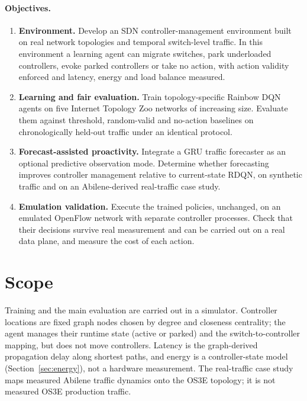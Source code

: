 \paragraph{Objectives.}
\begin{enumerate}[label=\textbf{O\arabic*.}, leftmargin=*]
  \item \textbf{Environment.} Develop an SDN controller-management environment built on real network topologies and temporal switch-level traffic. In this environment a learning agent can migrate switches, park underloaded controllers, evoke parked controllers or take no action, with action validity enforced and latency, energy and load balance measured.
  \item \textbf{Learning and fair evaluation.} Train topology-specific Rainbow DQN agents on five Internet Topology Zoo networks of increasing size. Evaluate them against threshold, random-valid and no-action baselines on chronologically held-out traffic under an identical protocol.
  \item \textbf{Forecast-assisted proactivity.} Integrate a GRU traffic forecaster as an optional predictive observation mode. Determine whether forecasting improves controller management relative to current-state RDQN, on synthetic traffic and on an Abilene-derived real-traffic case study.
  \item \textbf{Emulation validation.} Execute the trained policies, unchanged, on an emulated OpenFlow network with separate controller processes. Check that their decisions survive real measurement and can be carried out on a real data plane, and measure the cost of each action.
\end{enumerate}

\section{Scope}
\label{sec:scope}

Training and the main evaluation are carried out in a simulator. Controller locations are fixed graph nodes chosen by degree and closeness centrality; the agent manages their runtime state (active or parked) and the switch-to-controller mapping, but does not move controllers. Latency is the graph-derived propagation delay along shortest paths, and energy is a controller-state model (Section~\ref{sec:energy}), not a hardware measurement. The real-traffic case study maps measured Abilene traffic dynamics onto the OS3E topology; it is not measured OS3E production traffic.


